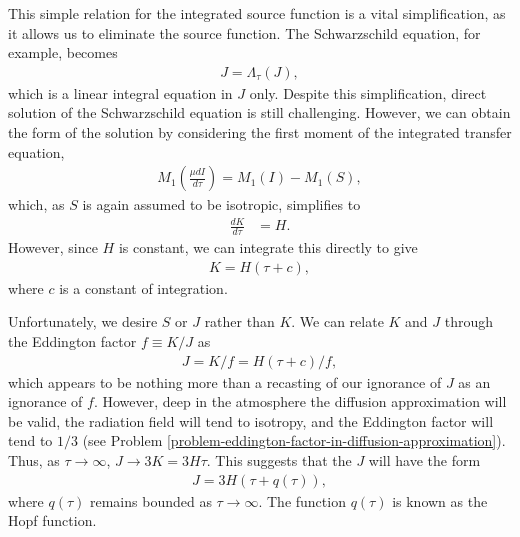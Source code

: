 \newslide

This simple relation for the integrated source function is a vital
simplification, as it allows us to eliminate the source function. The
Schwarzschild equation, for example, becomes
\begin{align}
J = \Lambda_\tau(J),
\end{align}
which is a linear integral equation in $J$ only. Despite this
simplification, direct solution of the Schwarzschild equation is still
challenging. However, we can obtain the form of the solution by
considering the first moment of the integrated transfer equation,
\begin{align}
M_1(\frac{\mu dI}{d\tau}) = M_1(I) - M_1(S),
\end{align}
which, as $S$ is again assumed to be isotropic, simplifies
to
\begin{align}
\frac{dK}{d\tau} &= H.
\end{align}
However, since $H$ is constant, we can integrate this
directly to give
\begin{align}
K = H(\tau + c),
\end{align}
where $c$ is a constant of integration.

\newslide

Unfortunately, we desire $S$ or
$J$ rather than $K$. We can relate $K$ and $J$ through the Eddington
factor $f \equiv K / J$ as
\begin{align}
J = K/ f = H (\tau + c) / f,
\end{align}
which appears to be nothing more than a recasting of our
ignorance of $J$ as an ignorance of $f$. However, deep in
the atmosphere the diffusion approximation will be valid,
the radiation field will tend to isotropy, and the Eddington
factor will tend to $1/3$ (see Problem
\ref{problem-eddington-factor-in-diffusion-approximation}).
Thus, as $\tau \rightarrow \infty$, $J \rightarrow 3K =
3H\tau$. This suggests that the $J$ will have the form
\begin{align}
J = 3H(\tau + q(\tau)),
\end{align}
where $q(\tau)$ remains bounded as $\tau \rightarrow
\infty$. The function $q(\tau)$ is known as the Hopf function.





